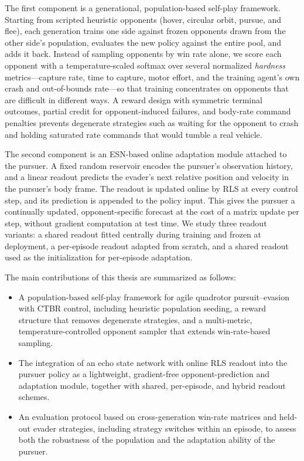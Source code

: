 The first component is a generational, population-based self-play framework. Starting from scripted heuristic opponents (hover, circular orbit, pursue, and flee), each generation trains one side against frozen opponents drawn from the other side's population, evaluates the new policy against the entire pool, and adds it back. Instead of sampling opponents by win rate alone, we score each opponent with a temperature-scaled softmax over several normalized \emph{hardness} metrics---capture rate, time to capture, motor effort, and the training agent's own crash and out-of-bounds rate---so that training concentrates on opponents that are difficult in different ways. A reward design with symmetric terminal outcomes, partial credit for opponent-induced failures, and body-rate command penalties prevents degenerate strategies such as waiting for the opponent to crash and holding saturated rate commands that would tumble a real vehicle.

The second component is an ESN-based online adaptation module attached to the pursuer. A fixed random reservoir encodes the pursuer's observation history, and a linear readout predicts the evader's next relative position and velocity in the pursuer's body frame. The readout is updated online by RLS at every control step, and its prediction is appended to the policy input. This gives the pursuer a continually updated, opponent-specific forecast at the cost of a matrix update per step, without gradient computation at test time. We study three readout variants: a shared readout fitted centrally during training and frozen at deployment, a per-episode readout adapted from scratch, and a shared readout used as the initialization for per-episode adaptation.

The main contributions of this thesis are summarized as follows:
\begin{itemize}
    \item A population-based self-play framework for agile quadrotor pursuit--evasion with CTBR control, including heuristic population seeding, a reward structure that removes degenerate strategies, and a multi-metric, temperature-controlled opponent sampler that extends win-rate-based sampling.
    \item The integration of an echo state network with online RLS readout into the pursuer policy as a lightweight, gradient-free opponent-prediction and adaptation module, together with shared, per-episode, and hybrid readout schemes.
    \item An evaluation protocol based on cross-generation win-rate matrices and held-out evader strategies, including strategy switches within an episode, to assess both the robustness of the population and the adaptation ability of the pursuer.
\end{itemize}


